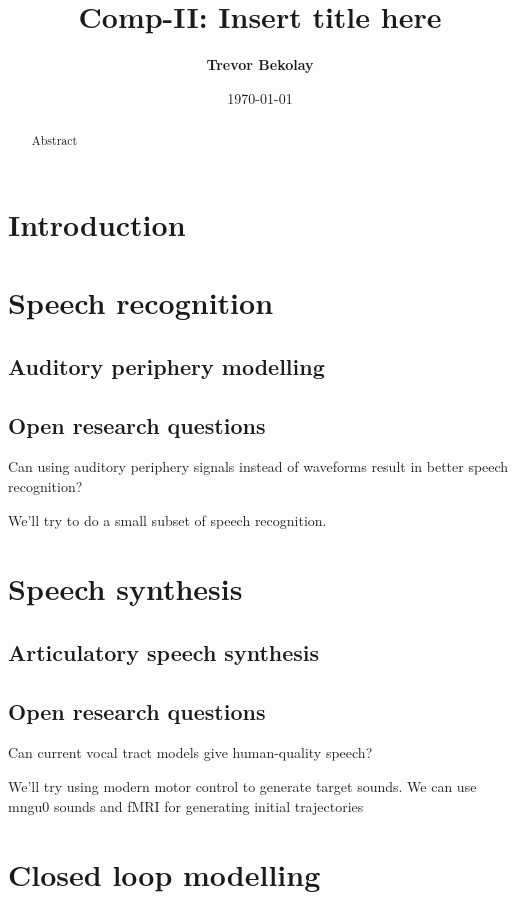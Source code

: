 \documentclass{article}
\title{Comp-II: Insert title here}
\date{\today}
\author{\textbf{Trevor Bekolay}}
\begin{document}
\maketitle

\begin{abstract}
  Abstract
\end{abstract}

\section{Introduction}

\section{Speech recognition}

\subsection{Auditory periphery modelling}

\subsection{Open research questions}

Can using auditory periphery signals
instead of waveforms
result in better speech recognition?

We'll try to do a small subset of speech recognition.

\section{Speech synthesis}

\subsection{Articulatory speech synthesis}

\subsection{Open research questions}

Can current vocal tract models give human-quality speech?

We'll try using modern motor control to generate target sounds.
We can use mngu0 sounds and fMRI for generating initial trajectories

\section{Closed loop modelling}
\end{document}
